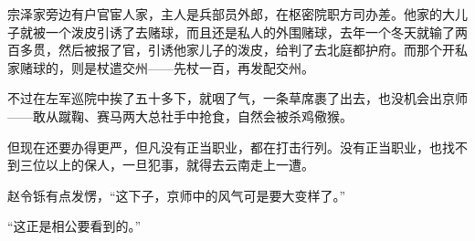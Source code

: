 宗泽家旁边有户官宦人家，主人是兵部员外郎，在枢密院职方司办差。他家的大儿子就被一个泼皮引诱了去赌球，而且还是私人的外围赌球，去年一个冬天就输了两百多贯，然后被报了官，引诱他家儿子的泼皮，给判了去北庭都护府。而那个开私家赌球的，则是杖遣交州——先杖一百，再发配交州。

不过在左军巡院中挨了五十多下，就咽了气，一条草席裹了出去，也没机会出京师——敢从蹴鞠、赛马两大总社手中抢食，自然会被杀鸡儆猴。

但现在还要办得更严，但凡没有正当职业，都在打击行列。没有正当职业，也找不到三位以上的保人，一旦犯事，就得去云南走上一遭。

赵令铄有点发愣，“这下子，京师中的风气可是要大变样了。”

“这正是相公要看到的。”
